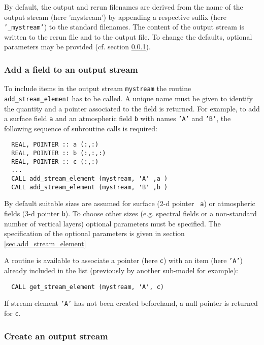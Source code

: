 By default, the output and rerun filenames are derived from the name
of the output stream (here 'mystream') by appending a respective
suffix (here {\tt '\_mystream'}) to the standard filenames.  The
content of the output stream is written to the rerun file and to the
output file. To change the defaults, optional parameters may be provided
(cf.{} section \ref{sec.new_stream}).

\subsubsection*{Add a field to an output stream}

To include items in the output stream {\tt mystream} the routine {\tt
add\_stream\_element} has to be called. A unique name must be given to
identify the quantity and a pointer associated to the field is
returned. For example, to add a surface field {\tt a} and an
atmospheric field {\tt b} with names {\tt 'A'} and {\tt 'B'}, the
following sequence of subroutine calls is 
required:
%
{\small
\begin{verbatim}
  REAL, POINTER :: a (:,:)
  REAL, POINTER :: b (:,:,:)
  REAL, POINTER :: c (:,:)
  ...
  CALL add_stream_element (mystream, 'A' ,a )
  CALL add_stream_element (mystream, 'B' ,b )
\end{verbatim}}
%
By default suitable sizes are assumed for surface (2-d pointer {\tt
a}) or atmospheric fields (3-d pointer {\tt b}).  To choose
other sizes (e.g.{} spectral fields or a non-standard number of
vertical layers) optional parameters must be specified.  The
specification of the optional parameters is given in section
{\ref{sec.add_stream_element}}

A routine is available to associate a pointer (here {\tt c}) with an
item (here {\tt 'A'}) already included in the list (previously by another
sub-model for example):
%
{\small
\begin{verbatim}
  CALL get_stream_element (mystream, 'A', c)
\end{verbatim}}
%
If stream element {\tt 'A'} has not been created beforehand, a null
pointer is returned for {\tt c}.

\subsubsection{Create an output stream}
\label{sec.new_stream}

